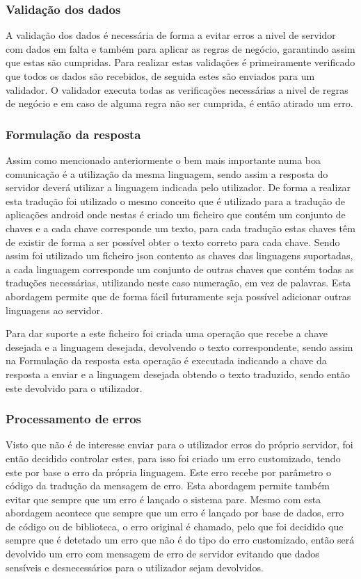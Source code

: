 \subsubsection{Validação dos dados}
A validação dos dados é necessária de forma a evitar erros a nivel de servidor com dados em falta e também para aplicar as regras de negócio, garantindo assim que estas são cumpridas. Para realizar estas validações é primeiramente verificado que todos os dados são recebidos, de seguida estes são enviados para um validador. O validador executa todas as verificações necessárias a nivel de regras de negócio e em caso de alguma regra não ser cumprida, é então atirado um erro.

\subsubsection{Formulação da resposta}
Assim como mencionado anteriormente o bem mais importante numa boa comunicação é a utilização da mesma linguagem, sendo assim a resposta do servidor deverá  utilizar a linguagem indicada pelo utilizador. De forma a realizar esta tradução foi utilizado o mesmo conceito que é utilizado para a tradução de aplicações android onde nestas é criado um ficheiro que contém um conjunto de chaves e a cada chave corresponde um texto, para cada tradução estas chaves têm de existir de forma a ser possível obter o texto correto para cada chave. Sendo assim foi utilizado um ficheiro json contento as chaves das linguagens suportadas, a cada linguagem corresponde um conjunto de outras chaves que contém todas as traduções necessárias, utilizando neste caso numeração, em vez de palavras. Esta abordagem permite que de forma fácil futuramente seja possível adicionar outras linguagens ao servidor.


Para dar suporte a este ficheiro foi criada uma operação que recebe a chave desejada e a linguagem desejada, devolvendo o texto correspondente, sendo assim na Formulação da resposta esta operação é executada indicando a chave da resposta a enviar e a linguagem desejada obtendo o texto traduzido, sendo então este devolvido para o utilizador.

\subsubsection{Processamento de erros}
Visto que não é de interesse enviar para o utilizador erros do próprio servidor, foi então decidido controlar estes, para isso foi criado um erro customizado, tendo este por base o erro da própria linguagem. Este erro recebe por parâmetro o código da tradução da mensagem de erro. Esta abordagem permite também evitar que sempre que um erro é lançado o sistema pare. Mesmo com esta abordagem acontece que sempre que um erro é lançado por base de dados, erro de código ou de biblioteca, o erro original é chamado, pelo que foi decidido que sempre que é detetado um erro que não é do tipo do erro customizado, então será devolvido um erro com mensagem de erro de servidor evitando que dados sensíveis e desnecessários para o utilizador sejam devolvidos.